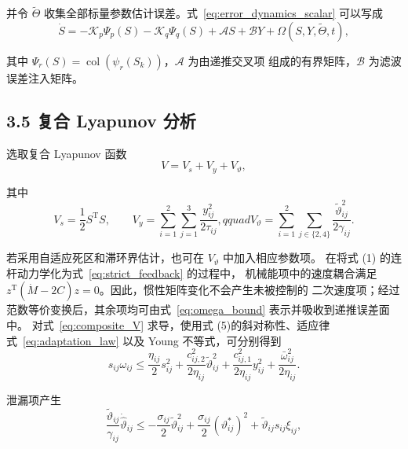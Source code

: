 \documentclass{article}
\begin{document}
并令 $\widetilde\Theta$ 收集全部标量参数估计误差。式~\eqref{eq:error_dynamics_scalar}
可以写成
\begin{equation}
 \dot S=-\mathcal K_p\Psi_p(S)-\mathcal K_q\Psi_q(S)
 +\mathcal A S+\mathcal B Y+\Omega(S,Y,\widetilde\Theta,t),

 \tag{63}
\label{eq:error_dynamics_vector}
\end{equation}

其中 $\Psi_r(S)=\operatorname{col}(\psi_r(S_k))$，$\mathcal A$ 为由递推交叉项
组成的有界矩阵，$\mathcal B$ 为滤波误差注入矩阵。

\subsection{3.5 复合 Lyapunov 分析}
\label{subsec:lyapunov}

选取复合 Lyapunov 函数
\begin{equation}
 V=V_s+V_y+V_\vartheta,

 \tag{64}
\label{eq:composite_V}
\end{equation}

其中
\begin{equation}
 V_s=\frac12S^{\mathrm T}S,\qquad
 V_y=\sum_{i=1}^{2}\sum_{j=1}^{3}\frac{y_{ij}^{2}}{2\tau_{ij}},qquad
 V_\vartheta=\sum_{i=1}^{2}\sum_{j\in\{2,4\}}
 \frac{\widetilde\vartheta_{ij}^{2}}{2\gamma_{ij}}.

 \tag{65}
\label{eq:V_components}
\end{equation}

若采用自适应死区和滞环界估计，也可在 $V_\vartheta$ 中加入相应参数项。
在将式 (1) 的连杆动力学化为式~\eqref{eq:strict_feedback} 的过程中，
机械能项中的速度耦合满足
$z^{\mathrm T}(\dot M-2C)z=0$。因此，惯性矩阵变化不会产生未被控制的
二次速度项；经过范数等价变换后，其余项均可由式~\eqref{eq:omega_bound}
表示并吸收到递推误差面中。
对式~\eqref{eq:composite_V} 求导，使用式 (5)的斜对称性、适应律
式~\eqref{eq:adaptation_law} 以及 Young 不等式，可分别得到
\begin{equation}
 s_{ij}\omega_{ij}
 \leq \frac{\eta_{ij}}{2}s_{ij}^{2}
 +\frac{c_{ij,2}^{2}}{2\eta_{ij}}\widetilde\vartheta_{ij}^{2}
 +\frac{c_{ij,1}^{2}}{2\eta_{ij}}y_{ij}^{2}
 +\frac{\bar\omega_{ij}^{2}}{2\eta_{ij}} .

 \tag{66}
\label{eq:young_omega}
\end{equation}

泄漏项产生
\begin{equation}
 \frac{\widetilde\vartheta_{ij}}{\gamma_{ij}}
 \dot{\hat\vartheta}_{ij}
 \leq -\frac{\sigma_{ij}}{2}\widetilde\vartheta_{ij}^{2}
 +\frac{\sigma_{ij}}{2}(\vartheta_{ij}^{*})^{2}
 +\widetilde\vartheta_{ij}s_{ij}\xi_{ij},

 \tag{67}
\label{eq:leakage_bound}
\end{equation}
\end{document}
